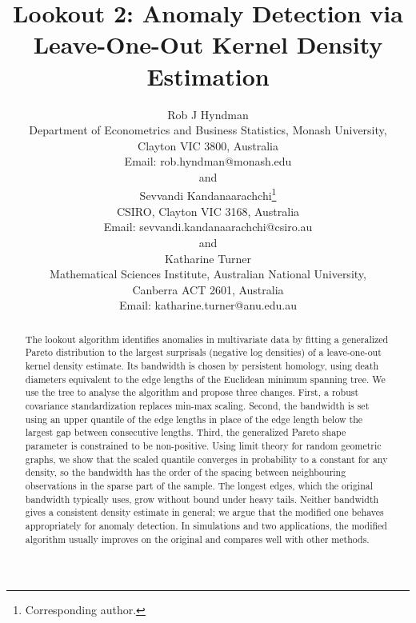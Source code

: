 \documentclass[12pt]{article}
\theoremstyle{plain}%
\theoremstyle{definition}
\def\spacingset#1{\renewcommand{\baselinestretch}%
{#1}\small\normalsize}
\begin{document}
\spacingset{1}


\title{\bf Lookout 2: Anomaly Detection via Leave-One-Out Kernel Density Estimation}
\author{
  Rob J Hyndman\\
  Department of Econometrics and Business Statistics, Monash University,\\
  Clayton VIC 3800, Australia\\
  Email: rob.hyndman@monash.edu\\
  and\\
  Sevvandi Kandanaarachchi\thanks{Corresponding author.}\\
  CSIRO, Clayton VIC 3168, Australia\\
  Email: sevvandi.kandanaarachchi@csiro.au\\
  and\\
  Katharine Turner\\
  Mathematical Sciences Institute, Australian National University,\\
  Canberra ACT 2601, Australia\\
  Email: katharine.turner@anu.edu.au
}
\maketitle

\bigskip
\begin{abstract}
  The lookout algorithm identifies anomalies in multivariate data by fitting a generalized Pareto distribution to the largest surprisals (negative log densities) of a leave-one-out kernel density estimate. Its bandwidth is chosen by persistent homology, using death diameters equivalent to the edge lengths of the Euclidean minimum spanning tree. We use the tree to analyse the algorithm and propose three changes. First, a robust covariance standardization replaces min-max scaling. Second, the bandwidth is set using an upper quantile of the edge lengths in place of the edge length below the largest gap between consecutive lengths. Third, the generalized Pareto shape parameter is constrained to be non-positive. Using limit theory for random geometric graphs, we show that the scaled quantile converges in probability to a constant for any density, so the bandwidth has the order of the spacing between neighbouring observations in the sparse part of the sample. The longest edges, which the original bandwidth typically uses, grow without bound under heavy tails. Neither bandwidth gives a consistent density estimate in general; we argue that the modified one behaves appropriately for anomaly detection. In simulations and two applications, the modified algorithm usually improves on the original and compares well with other methods.
\end{abstract}
\end{document}
